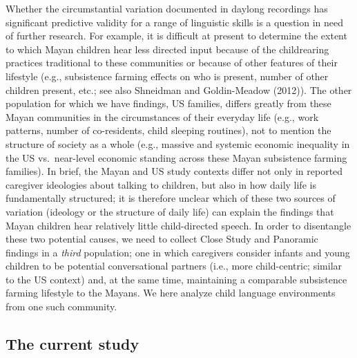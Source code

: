 \documentclass[,man,mask,floatsintext]{apa6}
\begin{document}
Whether the circumstantial variation documented in daylong recordings
has significant predictive validity for a range of linguistic skills is
a question in need of further research. For example, it is difficult at
present to determine the extent to which Mayan children hear less
directed input because of the childrearing practices traditional to
these communities or because of other features of their lifestyle (e.g.,
subsistence farming effects on who is present, number of other children
present, etc.; see also Shneidman and Goldin-Meadow (2012)). The other
population for which we have findings, US families, differs greatly from
these Mayan communities in the circumstances of their everyday life
(e.g., work patterns, number of co-residents, child sleeping routines),
not to mention the structure of society as a whole (e.g., massive and
systemic economic inequality in the US vs.~near-level economic standing
across these Mayan subsistence farming families). In brief, the Mayan
and US study contexts differ not only in reported caregiver ideologies
about talking to children, but also in how daily life is fundamentally
structured; it is therefore unclear which of these two sources of
variation (ideology or the structure of daily life) can explain the
findings that Mayan children hear relatively little child-directed
speech. In order to disentangle these two potential causes, we need to
collect Close Study and Panoramic findings in a \emph{third} population;
one in which caregivers consider infants and young children to be
potential conversational partners (i.e., more child-centric; similar to
the US context) and, at the same time, maintaining a comparable
subsistence farming lifestyle to the Mayans. We here analyze child
language environments from one such community.

\subsection{The current study}\label{the-current-study}
\end{document}
